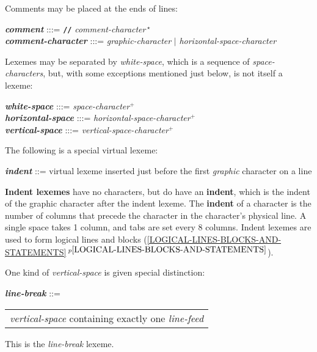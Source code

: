\documentclass[12pt]{article}
\newcommand{\TT}[1]{{\tt \bfseries #1}}
\newcommand{\PLUS}[1][]{{$^{+#1}$}}
\newcommand{\key}[1]{{\rm \bfseries #1}}
\newcommand{\emkey}[1]{{\em \bfseries #1}}
\newcommand{\ikey}[2]{{\rm \bfseries #1}}
\newcommand{\itemref}[1]{\ref{#1}$\,^{p\pageref{#1}}$}
\newenvironment{indpar}[1][0.3in]%
	{\begin{list}{}%
		     {\setlength{\itemsep}{0in}%
		      \setlength{\topsep}{0in}%
		      \setlength{\parsep}{1ex}%
		      \setlength{\labelwidth}{#1}%
		      \setlength{\leftmargin}{#1}%
		      \addtolength{\leftmargin}{\labelsep}}%
	 \item}%
	{\end{list}}
\begin{document}
Comments may be placed at the ends of lines:
\begin{indpar}
\emkey{comment}\label{COMMENT} :::=
    \TT{//} {\em comment-character}\,$^\star$
\\[1ex]
\emkey{comment-character} :::= {\em graphic-character}
                          $|$ {\em horizontal-space-character}
\end{indpar}

Lexemes may be separated by {\em white-space}, which
is a sequence of {\em space-characters},
but, with some exceptions mentioned just below, is not itself a lexeme:
\begin{indpar}
\emkey{white-space} :::= {\em space-character}\PLUS{}
\\[0.3ex]
\emkey{horizontal-space} :::= {\em horizontal-space-character}\PLUS{}
\\[0.3ex]
\emkey{vertical-space} :::= {\em vertical-space-character}\PLUS{}
\end{indpar}

The following is a special virtual lexeme:
\begin{indpar}
\emkey{indent}\label{INDENT} ::=
        virtual lexeme inserted just before the first
	{\em graphic} character on a line
\end{indpar}

\ikey{Indent lexemes}{indent lexeme} have no characters, but
do have an \key{indent}, which is the indent of
the graphic character after the indent lexeme.
The \key{indent} of a character is the number
of columns that precede the character in the character's physical line.
A single space takes 1 column, and tabs are set every 8 columns.
Indent lexemes are used to form logical lines and blocks
(\itemref{LOGICAL-LINES-BLOCKS-AND-STATEMENTS}).

One kind of {\em vertical-space} is given special distinction:
\begin{indpar}
\emkey{line-break}\label{LINE-BREAK} ::=
	\begin{tabular}[t]{l}
        {\em vertical-space} containing exactly one {\em line-feed}
	\end{tabular}
\end{indpar}

This is the {\em line-break} lexeme.
\end{document}
